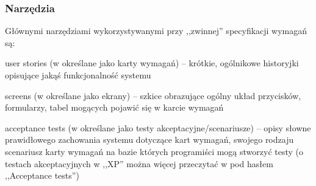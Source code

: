 
\subsubsection{Narzędzia}
\label{sec:ZSWnarzedzia}

Głównymi narzędziami wykorzystywanymi przy ,,zwinnej'' specyfikacji wymagań są:
\begin{packed_item}
    \item user stories (w \cite{Mad09} określane jako karty wymagań) -- krótkie, ogólnikowe historyjki opisujące jakąś funkcjonalność systemu
    \item screens (w \cite{Mad09} określane jako ekrany) -- szkice obrazujące ogólny układ przycisków, formularzy, tabel mogących pojawić się w karcie wymagań
    \item acceptance tests (w \cite{Mad09} określane jako testy akceptacyjne/scenariusze) -- opisy słowne prawidłowego zachowania systemu dotyczące kart wymagań, swojego rodzaju scenariusz karty wymagań na bazie których programiści mogą stworzyć testy (o testach akceptacyjnych w ,,XP'' można więcej przeczytać w \cite{Jef00} pod hasłem ,,Acceptance tests'')  
\end{packed_item}

